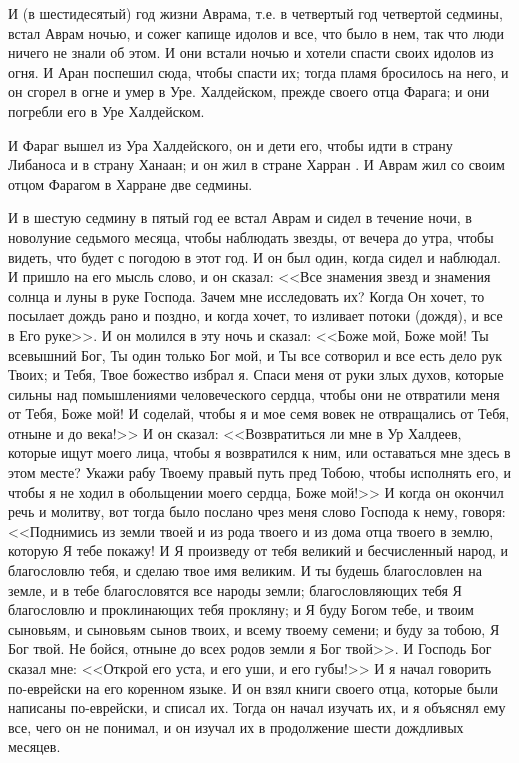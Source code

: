 И (в шестидесятый) год жизни Аврама, т.е. в
четвертый год четвертой седмины, встал Аврам
ночью, и сожег капище идолов и все, что было в нем,
так что люди ничего не знали об этом. И они встали
ночью и хотели спасти своих идолов из огня. И Аран
поспешил сюда, чтобы спасти их; тогда пламя
бросилось на него, и он сгорел в огне и умер в Уре.
Халдейском, прежде своего отца Фарага; и они
погребли его в Уре Халдейском.

И Фараг вышел из Ура Халдейского, он и дети его,
чтобы идти в страну Либаноса и в страну Ханаан; и
он жил в стране Харран . И Аврам жил со своим отцом
Фарагом в Харране две седмины.

И в шестую седмину в пятый год ее встал Аврам и
сидел в течение ночи, в новолуние седьмого
месяца, чтобы наблюдать звезды, от вечера до утра,
чтобы видеть, что будет с погодою в этот год. И он
был один, когда сидел и наблюдал. И пришло на его
мысль слово, и он сказал: <<Все знамения звезд и
знамения солнца и луны в руке Господа. Зачем мне
исследовать их? Когда Он хочет, то посылает дождь
рано и поздно, и когда хочет, то изливает потоки
(дождя), и все в Его руке>>. И он молился в эту
ночь и сказал: <<Боже мой, Боже мой! Ты всевышний
Бог, Ты один только Бог мой, и Ты все сотворил и
все есть дело рук Твоих; и Тебя, Твое божество
избрал я. Спаси меня от руки злых духов, которые
сильны над помышлениями человеческого сердца,
чтобы они не отвратили меня от Тебя, Боже мой! И
соделай, чтобы я и мое семя вовек не отвращались от
Тебя, отныне и до века!>> И он сказал:
<<Возвратиться ли мне в Ур Халдеев, которые
ищут моего лица, чтобы я возвратился к ним, или
оставаться мне здесь в этом месте? Укажи рабу
Твоему правый путь пред Тобою, чтобы исполнять
его, и чтобы я не ходил в обольщении моего сердца,
Боже мой!>> И когда он окончил речь и молитву,
вот тогда было послано чрез меня слово Господа к
нему, говоря: <<Поднимись из земли твоей и из
рода твоего и из дома отца твоего в землю, которую
Я тебе покажу! И Я произведу от тебя великий и
бесчисленный народ, и благословлю тебя, и сделаю
твое имя великим. И ты будешь благословлен на
земле, и в тебе благословятся все народы земли;
благословляющих тебя Я благословлю и
проклинающих тебя прокляну; и Я буду Богом тебе, и
твоим сыновьям, и сыновьям сынов твоих, и всему
твоему семени; и буду за тобою, Я Бог твой. Не
бойся, отныне до всех родов земли я Бог твой>>. И
Господь Бог сказал мне: <<Открой его уста, и его
уши, и его губы!>> И я начал говорить по-еврейски
на его коренном языке. И он взял книги своего
отца, которые были написаны по-еврейски, и списал
их. Тогда он начал изучать их, и я объяснял ему
все, чего он не понимал, и он изучал их в
продолжение шести дождливых месяцев.

